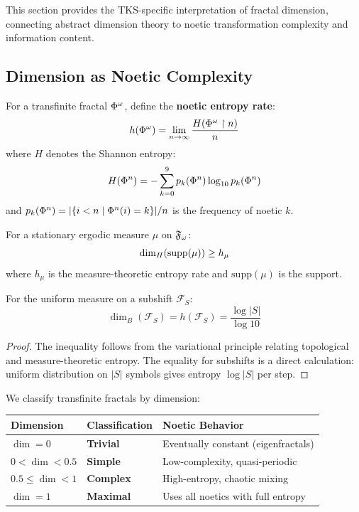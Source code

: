 \begin{tcolorbox}[colback=blue!5!white,colframe=blue!75!black,title=\vnewthree]
This section provides the TKS-specific interpretation of fractal dimension, connecting abstract dimension theory to noetic transformation complexity and information content.
\end{tcolorbox}

\subsection{Dimension as Noetic Complexity}

\begin{definition}
\label{def:noetic-entropy-rate}
For a transfinite fractal $\Phi^{\omega}$, define the \textbf{noetic entropy rate}:
\[
h(\Phi^{\omega}) = \lim_{n \to \infty} \frac{H(\Phi^{\omega} \restriction n)}{n}
\]
where $H$ denotes the Shannon entropy:
\[
H(\Phi^{n}) = -\sum_{k=0}^{9} p_k(\Phi^{n}) \log_{10} p_k(\Phi^{n})
\]
and $p_k(\Phi^{n}) = |\{i < n \mid \Phi^{n}(i) = k\}| / n$ is the frequency of noetic $k$.
\end{definition}

\begin{theorem}
\label{thm:entropy-dimension}
For a stationary ergodic measure $\mu$ on $\mathfrak{F}_\omega$:
\[
\dim_H(\mathrm{supp}(\mu)) \geq h_\mu
\]
where $h_\mu$ is the measure-theoretic entropy rate and $\mathrm{supp}(\mu)$ is the support.

For the uniform measure on a subshift $\mathcal{F}_S$:
\[
\dim_B(\mathcal{F}_S) = h(\mathcal{F}_S) = \frac{\log |S|}{\log 10}
\]
\end{theorem}

\begin{proof}
The inequality follows from the variational principle relating topological and measure-theoretic entropy. The equality for subshifts is a direct calculation: uniform distribution on $|S|$ symbols gives entropy $\log |S|$ per step.
\end{proof}

\begin{definition}
\label{def:complexity-class}
We classify transfinite fractals by dimension:

\begin{center}
\begin{tabular}{lll}
\toprule
\textbf{Dimension} & \textbf{Classification} & \textbf{Noetic Behavior} \\
\midrule
$\dim = 0$ & \textbf{Trivial} & Eventually constant (eigenfractals) \\
$0 < \dim < 0.5$ & \textbf{Simple} & Low-complexity, quasi-periodic \\
$0.5 \leq \dim < 1$ & \textbf{Complex} & High-entropy, chaotic mixing \\
$\dim = 1$ & \textbf{Maximal} & Uses all noetics with full entropy \\
\bottomrule
\end{tabular}
\end{center}
\end{definition}

